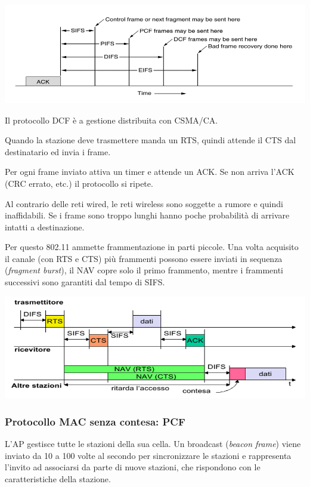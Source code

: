             \begin{center}
                \includegraphics[scale=0.346]{chapters/3/assets/schema_v.png}
            \end{center}

            Il protocollo DCF è a gestione distribuita con CSMA/CA.

            Quando la stazione deve trasmettere manda un RTS, quindi attende il CTS dal destinatario ed invia i frame.

            Per ogni frame inviato attiva un timer e attende un ACK. Se non arriva l'ACK (CRC errato, etc.) il protocollo si ripete.

            Al contrario delle reti wired, le reti wireless sono soggette a rumore e quindi inaffidabili. Se i frame sono troppo lunghi hanno poche probabilità di arrivare intatti a destinazione.

            Per questo 802.11 ammette frammentazione in parti piccole. Una volta acquisito il canale (con RTS e CTS) più frammenti possono essere inviati in sequenza (\textit{fragment burst}), il NAV copre solo il primo frammento, mentre i frammenti successivi sono garantiti dal tempo di SIFS.

            \begin{center}
                \includegraphics[scale=0.35]{chapters/3/assets/schema_w.png}
            \end{center}

        \subsubsection{Protocollo MAC senza contesa: PCF}
            L'AP gestisce tutte le stazioni della sua cella. Un broadcast (\textit{beacon frame}) viene inviato da 10 a 100 volte al secondo per sincronizzare le stazioni e rappresenta l'invito ad associarsi da parte di nuove stazioni, che rispondono con le caratteristiche della stazione.

